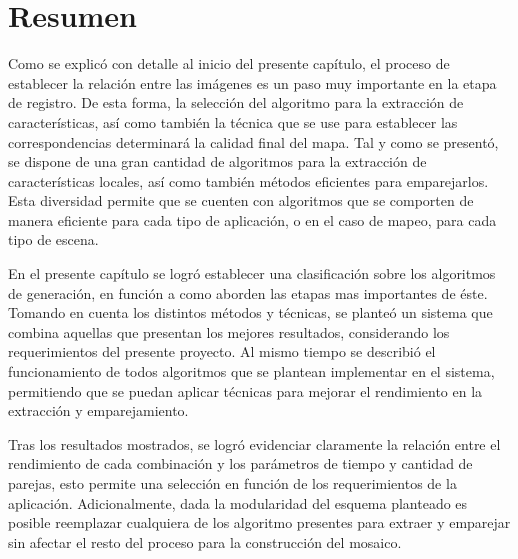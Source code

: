 
\section{Resumen}

Como se explicó con detalle al inicio del presente capítulo, el proceso de establecer la relación entre las imágenes es un paso muy importante en la etapa de registro. De esta forma, la selección del algoritmo para la extracción de características, así como también la técnica que se use para establecer las correspondencias determinará la calidad final del mapa. Tal y como se presentó, se dispone de una gran cantidad de algoritmos para la extracción de características locales, así como también métodos eficientes para emparejarlos. Esta diversidad permite que se cuenten con algoritmos que se comporten de manera eficiente para cada tipo de aplicación, o en el caso de mapeo, para cada tipo de escena. 

En el presente capítulo se logró establecer una clasificación sobre los algoritmos de generación, en función a como aborden las etapas mas importantes de éste. Tomando en cuenta los distintos métodos y técnicas, se planteó un sistema que combina aquellas que presentan los mejores resultados, considerando los requerimientos del presente proyecto. Al mismo tiempo se describió el funcionamiento de todos algoritmos que se plantean implementar en el sistema, permitiendo que se puedan aplicar técnicas para mejorar el rendimiento en la extracción y emparejamiento. 

Tras los resultados mostrados, se logró evidenciar claramente la relación entre el rendimiento de cada combinación y los parámetros de tiempo y cantidad de parejas, esto permite una selección en función de los requerimientos de la aplicación. Adicionalmente, dada la modularidad del esquema planteado es posible reemplazar cualquiera de los algoritmo presentes para extraer y emparejar sin afectar el resto del proceso para la construcción del mosaico.
